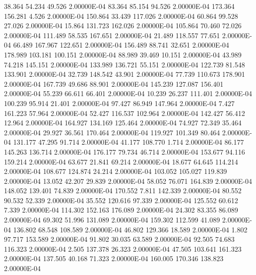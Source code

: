     38.364    54.234    49.526  2.00000E-04
    83.364    85.154    94.526  2.00000E-04
   173.364   156.281     4.526  2.00000E-04
   150.864    33.439   117.026  2.00000E-04
    60.864    99.528    27.026  2.00000E-04
    15.864   131.723   162.026  2.00000E-04
   105.864    70.460    72.026  2.00000E-04
   111.489    58.535   167.651  2.00000E-04
    21.489   118.557    77.651  2.00000E-04
    66.489   167.967   122.651  2.00000E-04
   156.489    88.741    32.651  2.00000E-04
   178.989   103.181   100.151  2.00000E-04
    88.989    39.469    10.151  2.00000E-04
    43.989    74.218   145.151  2.00000E-04
   133.989   136.721    55.151  2.00000E-04
   122.739    81.548   133.901  2.00000E-04
    32.739   148.542    43.901  2.00000E-04
    77.739   110.673   178.901  2.00000E-04
   167.739    49.686    88.901  2.00000E-04
   145.239   127.087   156.401  2.00000E-04
    55.239    66.611    66.401  2.00000E-04
    10.239    26.237   111.401  2.00000E-04
   100.239    95.914    21.401  2.00000E-04
    97.427    86.949   147.964  2.00000E-04
     7.427   161.223    57.964  2.00000E-04
    52.427   116.537   102.964  2.00000E-04
   142.427    56.412    12.964  2.00000E-04
   164.927   134.169   125.464  2.00000E-04
    74.927    72.349    35.464  2.00000E-04
    29.927    36.561   170.464  2.00000E-04
   119.927   101.349    80.464  2.00000E-04
   131.177    47.295    91.714  2.00000E-04
    41.177   108.770     1.714  2.00000E-04
    86.177   145.263   136.714  2.00000E-04
   176.177    79.734    46.714  2.00000E-04
   153.677    94.116   159.214  2.00000E-04
    63.677    21.841    69.214  2.00000E-04
    18.677    64.645   114.214  2.00000E-04
   108.677   124.874    24.214  2.00000E-04
   103.052   105.027   119.839  2.00000E-04
    13.052    42.207    29.839  2.00000E-04
    58.052    76.071   164.839  2.00000E-04
   148.052   139.401    74.839  2.00000E-04
   170.552     7.811   142.339  2.00000E-04
    80.552    90.532    52.339  2.00000E-04
    35.552   120.616    97.339  2.00000E-04
   125.552    60.612     7.339  2.00000E-04
   114.302   152.163   176.089  2.00000E-04
    24.302    83.355    86.089  2.00000E-04
    69.302    51.996   131.089  2.00000E-04
   159.302   112.599    41.089  2.00000E-04
   136.802    68.548   108.589  2.00000E-04
    46.802   129.366    18.589  2.00000E-04
     1.802    97.717   153.589  2.00000E-04
    91.802    30.035    63.589  2.00000E-04
    92.505    74.683   116.323  2.00000E-04
     2.505   137.378    26.323  2.00000E-04
    47.505   103.641   161.323  2.00000E-04
   137.505    40.168    71.323  2.00000E-04
   160.005   170.346   138.823  2.00000E-04
